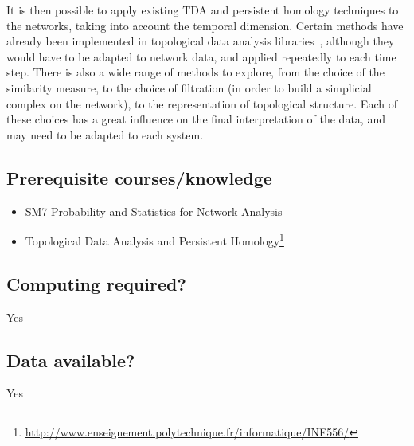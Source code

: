 \documentclass[article,a4paper,11pt,openany,extrafontsizes]{memoir}
\begin{document}
It is then possible to apply existing TDA and persistent homology
techniques to the networks, taking into account the temporal
dimension. Certain methods have already been implemented in
topological data analysis libraries~\cite{tierny_topology_2017,
  maria_gudhi_2014}, although they would have to be adapted to network
data, and applied repeatedly to each time step. There is also a wide
range of methods to explore, from the choice of the similarity
measure, to the choice of filtration (in order to build a simplicial
complex on the network), to the representation of topological
structure. Each of these choices has a great influence on the final
interpretation of the data, and may need to be adapted to each system.

\subsection*{Prerequisite courses/knowledge}

\begin{itemize}
\item SM7 Probability and Statistics for Network Analysis
\item Topological Data Analysis and Persistent
  Homology\footnote{\url{http://www.enseignement.polytechnique.fr/informatique/INF556/}}
\end{itemize}

\subsection*{Computing required?}

Yes

\subsection*{Data available?}

Yes

% 
% 
\printbibliography%
\end{document}
